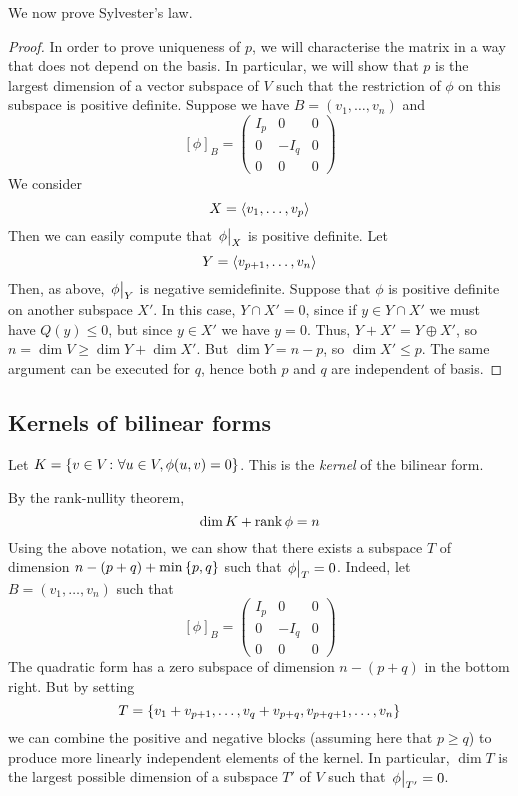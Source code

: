 \noindent We now prove Sylvester's law.
\begin{proof}
	In order to prove uniqueness of \( p \), we will characterise the matrix in a way that does not depend on the basis.
	In particular, we will show that \( p \) is the largest dimension of a vector subspace of \( V \) such that the restriction of \( \phi \) on this subspace is positive definite.
	Suppose we have \( B = (v_1, \dots, v_n) \) and
	\[
		[\phi]_B = \begin{pmatrix}
			I_p & 0    & 0 \\
			0   & -I_q & 0 \\
			0   & 0    & 0
		\end{pmatrix}
	\]
	We consider
	\[
		X = \langle{} v_1, \dots, v_p \rangle
	\]
	Then we can easily compute that \( \eval{\phi}_X \) is positive definite.
	Let
	\[
		Y = \langle{} v_{p+1}, \dots, v_n \rangle
	\]
	Then, as above, \( \eval{\phi}_Y \) is negative semidefinite.
	Suppose that \( \phi \) is positive definite on another subspace \( X' \).
	In this case, \( Y \cap X' = \qty{0} \), since if \( y \in Y \cap X' \) we must have \( Q(y) \leq 0 \), but since \( y \in X' \) we have \( y = 0 \).
	Thus, \( Y + X' = Y \oplus X' \), so \( n = \dim V \geq \dim Y + \dim X' \).
	But \( \dim Y = n - p \), so \( \dim X' \leq p \).
	The same argument can be executed for \( q \), hence both \( p \) and \( q \) are independent of basis.
\end{proof}

\subsection{Kernels of bilinear forms}
\begin{definition}
	Let \( K = \qty{ v \in V \colon \forall u \in V, \phi(u,v) = 0 } \).
	This is the \textit{kernel} of the bilinear form.
\end{definition}
\begin{remark}
	By the rank-nullity theorem,
	\[
		\dim K + \rank \phi = n
	\]
	Using the above notation, we can show that there exists a subspace \( T \) of dimension \( n - (p+q) + \min\qty{p,q} \) such that \( \eval{\phi}_T = 0 \).
	Indeed, let \( B = (v_1, \dots, v_n) \) such that
	\[
		[\phi]_B = \begin{pmatrix}
			I_p & 0    & 0 \\
			0   & -I_q & 0 \\
			0   & 0    & 0
		\end{pmatrix}
	\]
	The quadratic form has a zero subspace of dimension \( n - (p+q) \) in the bottom right.
	But by setting
	\[
		T = \qty{v_1 + v_{p+1}, \dots, v_q + v_{p+q}, v_{p+q+1}, \dots, v_n}
	\]
	we can combine the positive and negative blocks (assuming here that \( p \geq q \)) to produce more linearly independent elements of the kernel.
	In particular, \( \dim T \) is the largest possible dimension of a subspace \( T' \) of \( V \) such that \( \eval{\phi}_{T'} = 0 \).
\end{remark}

